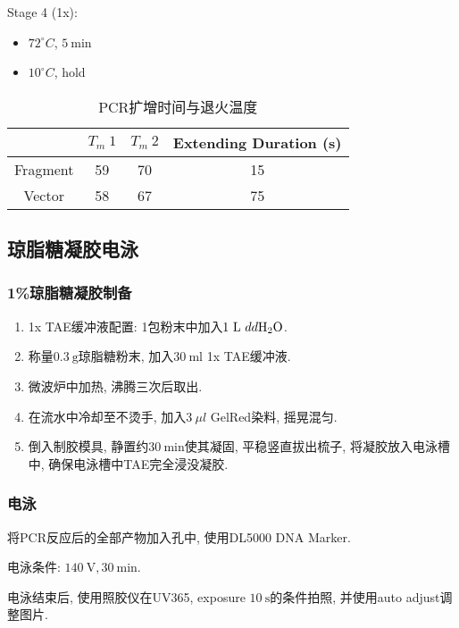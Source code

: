\documentclass{article}
\begin{document}
Stage 4 (1x):
\begin{itemize}
    \item $72^\circ C$, $5\ \mbox{min}$
    \item $10^\circ C$, hold
\end{itemize}

\begin{table}[htbp]
    \centering
    \begin{tabular}{cccc}
        \toprule
          & $T_m\ 1$ & $T_m\ 2$ & Extending Duration (s) \\
        \midrule
        Fragment & 59 & 70 & 15 \\
        Vector & 58 & 67 & 75 \\
        \bottomrule
    \end{tabular}
    \caption{PCR扩增时间与退火温度}
    \label{tab:pcr_time}
\end{table} 

\subsection{琼脂糖凝胶电泳}

\subsubsection{1\%琼脂糖凝胶制备}

\begin{enumerate}
    \item 1x TAE缓冲液配置: 1包粉末中加入$1\ \mbox{L}\ dd\ce{H2O}$.
    \item 称量$0.3\ \mbox{g}$琼脂糖粉末, 加入$30\ \mbox{ml}$ 1x TAE缓冲液.
    \item 微波炉中加热, 沸腾三次后取出.
    \item 在流水中冷却至不烫手, 加入$3\ \mu l$ GelRed染料, 摇晃混匀.
    \item 倒入制胶模具, 静置约$30\ \mbox{min}$使其凝固, 平稳竖直拔出梳子, 将凝胶放入电泳槽中, 确保电泳槽中TAE完全浸没凝胶.
\end{enumerate}

\subsubsection{电泳}

将PCR反应后的全部产物加入孔中, 使用DL5000 DNA Marker.

电泳条件: $140\ \mbox{V}, 30\ \mbox{min}$.

电泳结束后, 使用照胶仪在UV365, exposure $10\ \mbox{s}$的条件拍照, 并使用auto adjust调整图片.
\end{document}
